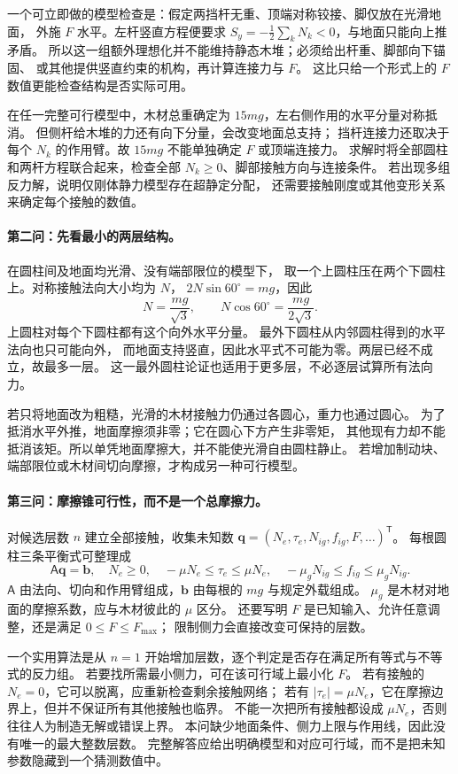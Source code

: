 \documentclass[UTF8,zihao=-4,fontset=fandol,a4paper]{ctexart}
\newcommand{\vect}[1]{\bm{#1}}
\begin{document}
一个可立即做的模型检查是：假定两挡杆无重、顶端对称铰接、脚仅放在光滑地面，
外施 $F$ 水平。左杆竖直方程便要求
$S_y=-\tfrac12\sum_kN_k<0$，与地面只能向上推矛盾。
所以这一组额外理想化并不能维持静态木堆；必须给出杆重、脚部向下锚固、
或其他提供竖直约束的机构，再计算连接力与 $F$。
这比只给一个形式上的 $F$ 数值更能检查结构是否实际可用。

在任一完整可行模型中，木材总重确定为 $15mg$，左右侧作用的水平分量对称抵消。
但侧杆给木堆的力还有向下分量，会改变地面总支持；
挡杆连接力还取决于每个 $N_k$ 的作用臂。故 $15mg$ 不能单独确定 $F$ 或顶端连接力。
求解时将全部圆柱和两杆方程联合起来，检查全部 $N_k\ge0$、脚部接触方向与连接条件。
若出现多组反力解，说明仅刚体静力模型存在超静定分配，
还需要接触刚度或其他变形关系来确定每个接触的数值。

\paragraph{第二问：先看最小的两层结构。}
在圆柱间及地面均光滑、没有端部限位的模型下，
取一个上圆柱压在两个下圆柱上。对称接触法向大小均为 $N$，
$2N\sin60^\circ=mg$，因此
\[
N=\frac{mg}{\sqrt3},\qquad N\cos60^\circ=\frac{mg}{2\sqrt3}.
\]
上圆柱对每个下圆柱都有这个向外水平分量。
最外下圆柱从内邻圆柱得到的水平法向也只可能向外，
而地面支持竖直，因此水平式不可能为零。两层已经不成立，故最多一层。
这一最外圆柱论证也适用于更多层，不必逐层试算所有法向力。

若只将地面改为粗糙，光滑的木材接触力仍通过各圆心，重力也通过圆心。
为了抵消水平外推，地面摩擦须非零；它在圆心下方产生非零矩，
其他现有力却不能抵消该矩。所以单凭地面摩擦大，并不能使光滑自由圆柱静止。
若增加制动块、端部限位或木材间切向摩擦，才构成另一种可行模型。

\paragraph{第三问：摩擦锥可行性，而不是一个总摩擦力。}
对候选层数 $n$ 建立全部接触，收集未知数
$\vect q=(N_e,\tau_e,N_{ig},f_{ig},F,\ldots)^{\mathsf T}$。
每根圆柱三条平衡式可整理成
\[
\mathsf A\vect q=\vect b,
\quad N_e\ge0,\quad -\mu N_e\le\tau_e\le\mu N_e,
\quad -\mu_gN_{ig}\le f_{ig}\le\mu_gN_{ig}.
\]
$\mathsf A$ 由法向、切向和作用臂组成，$\vect b$ 由每根的 $mg$ 与规定外载组成。
$\mu_g$ 是木材对地面的摩擦系数，应与木材彼此的 $\mu$ 区分。
还要写明 $F$ 是已知输入、允许任意调整，还是满足 $0\le F\le F_{\max}$；
限制侧力会直接改变可保持的层数。

一个实用算法是从 $n=1$ 开始增加层数，逐个判定是否存在满足所有等式与不等式的反力组。
若要找所需最小侧力，可在该可行域上最小化 $F$。
若有接触的 $N_e=0$，它可以脱离，应重新检查剩余接触网络；
若有 $|\tau_e|=\mu N_e$，它在摩擦边界上，但并不保证所有其他接触也临界。
不能一次把所有接触都设成 $\mu N_e$，否则往往人为制造无解或错误上界。
本问缺少地面条件、侧力上限与作用线，因此没有唯一的最大整数层数。
完整解答应给出明确模型和对应可行域，而不是把未知参数隐藏到一个猜测数值中。
\end{document}
